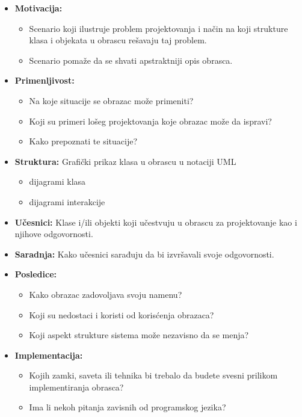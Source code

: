 \documentclass[a4paper]{article}
\begin{document}
\begin{itemize}
\newpage
    \item \textbf{Motivacija:}
          \begin{itemize}
            \item Scenario koji ilustruje problem projektovanja i način na koji strukture klasa 
                  i objekata u obrascu rešavaju taj problem.
            \item Scenario pomaže da se shvati apstraktniji opis obrasca.
          \end{itemize}
    \item \textbf{Primenljivost:}
          \begin{itemize}
            \item Na koje situacije se obrazac može primeniti?
            \item Koji su primeri lošeg projektovanja koje obrazac može da ispravi?
            \item Kako prepoznati te situacije?
          \end{itemize}
    \item \textbf{Struktura:} Grafički prikaz klasa u obrascu u notaciji UML 
          \begin{itemize}
            \item dijagrami klasa
            \item dijagrami interakcije
          \end{itemize}
    \item \textbf{Učesnici:} Klase i/ili objekti koji učestvuju u obrascu za projektovanje kao i njihove odgovornosti.
    \item \textbf{Saradnja:} Kako učesnici sarađuju da bi izvršavali svoje odgovornosti.
    \item \textbf{Posledice:}
          \begin{itemize}
            \item Kako obrazac zadovoljava svoju namenu?
            \item Koji su nedostaci i koristi od korisćenja obrazaca?
            \item Koji aspekt strukture sistema može nezavisno da se menja?
          \end{itemize}
    \item \textbf{Implementacija:}
          \begin{itemize}
            \item Kojih zamki, saveta ili tehnika bi trebalo da budete svesni prilikom 
                  implementiranja obrasca?
            \item Ima li nekoh pitanja zavisnih od programskog jezika?

\end{itemize}
\end{itemize}
\end{document}
